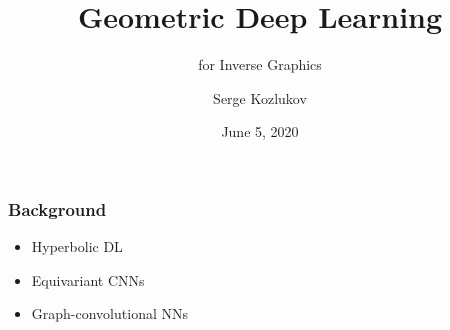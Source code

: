 \usepackage{ifxetex}
\ifxetex
    \usepackage{fontspec}
    \usepackage{xunicode}
    \usepackage{xltxtra}
    \usepackage{xecyr}
    \usepackage{polyglossia}

    \setmainlanguage{english}
\else
    \usepackage[T1]{fontenc}
    \usepackage[utf8]{inputenc}
    \usepackage{lmodern}
\fi

%
\usepackage[logo=sklogo]{beamerskoltech} 

\usepackage{amsmath}
\usepackage{amssymb}
\usepackage{amsfonts}

\usepackage{hyperref}

\usepackage[natbib=true]{biblatex}
\usepackage{bibentry}
\usepackage{doi}


\usepackage{tikz}
\usepackage{pgfplots}
\usetikzlibrary{calc}

\title{Geometric Deep Learning}
\subtitle{for Inverse Graphics}
\author{Serge Kozlukov}
\date{June 5, 2020}



\frame{\titlepage}


\begin{frame}\frametitle{Background}
    \begin{itemize}
            \item Hyperbolic DL
            \item Equivariant CNNs
            \item Graph-convolutional NNs
    \end{itemize}
\end{frame}

